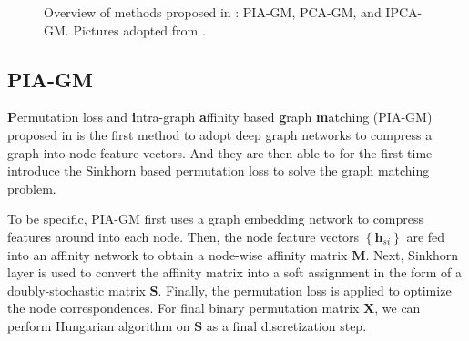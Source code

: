 \documentclass[a4paper]{article}
\newcommand{\set}[1]{\left\{#1\right\}}
\begin{document}
\begin{figure}[htbp]
    \centering


    \caption{Overview of methods proposed in \cite{pca-ipca}: PIA-GM, PCA-GM, and IPCA-GM. Pictures adopted from \cite{pca-ipca}.}
\end{figure}

\subsection{PIA-GM}
\textbf{P}ermutation loss and \textbf{i}ntra-graph \textbf{a}ffinity based \textbf{g}raph \textbf{m}atching (PIA-GM) proposed in \cite{pca-ipca} is the first method to adopt deep graph networks to compress a graph into node feature vectors. And they are then able to for the first time introduce the Sinkhorn \cite{sinkhorn} based permutation loss to solve the graph matching problem.

To be specific, PIA-GM first uses a graph embedding network to compress features around into each node. Then, the node feature vectors $\set{\mathbf{h}_{si}}$ are fed into an affinity network to obtain a node-wise affinity matrix $\mathbf{M}$. Next, Sinkhorn layer is used to convert the affinity matrix into a soft assignment in the form of a doubly-stochastic matrix $\mathbf{S}$. Finally, the permutation loss is applied to optimize the node correspondences. For final binary permutation matrix $\mathbf{X}$, we can perform Hungarian \cite{hungarian} algorithm on $\mathbf{S}$ as a final discretization step.
\end{document}
